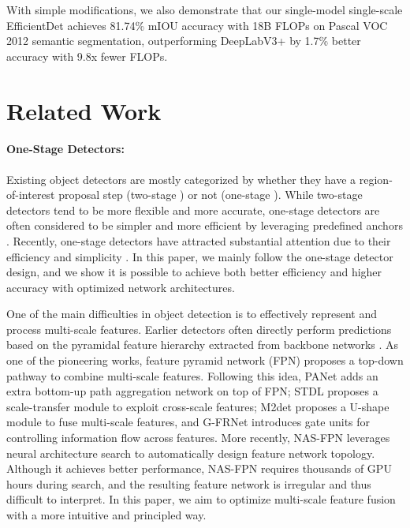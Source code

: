 \documentclass[10pt,twocolumn,letterpaper]{article}
\begin{document}
With simple modifications, we also demonstrate that our single-model single-scale EfficientDet achieves 81.74\% mIOU accuracy with 18B FLOPs on Pascal VOC 2012 semantic segmentation, outperforming DeepLabV3+ \cite{deeplabv3plus14} by 1.7\% better accuracy with 9.8x fewer FLOPs.


\section{Related Work}
\label{sec:related}

\paragraph{One-Stage Detectors: } Existing object detectors are mostly categorized by whether they have a region-of-interest proposal step (two-stage \cite{fastrcnn15,fasterrcnn15,cascade18,maskrcnn17}) or not (one-stage \cite{overfeat14,ssd16,yolo17,retinanet17}).
While two-stage detectors tend to be more flexible and more accurate, one-stage detectors are often considered to be simpler and more efficient by leveraging predefined anchors \cite{speedod17}. Recently,  one-stage detectors have attracted substantial attention  due to th\texttt{}eir efficiency and simplicity \cite{cornetnet18,m2det19,objectpoints19}. In this paper, we mainly follow the one-stage detector design, and we show it is possible to achieve both better efficiency and higher accuracy with optimized network architectures.

\medbreak \noindent {} One of the main difficulties in object detection is to effectively represent and process multi-scale features. Earlier detectors often directly perform predictions based on the pyramidal feature hierarchy extracted from backbone networks \cite{multiscaleod16,ssd16,overfeat14}. As one of the pioneering works, feature pyramid network  (FPN) \cite{fpn17} proposes a top-down pathway to combine multi-scale features. Following this idea, PANet \cite{panet18} adds an extra bottom-up path aggregation network on top of FPN; STDL \cite{stdn18} proposes a scale-transfer module to exploit cross-scale features; M2det \cite{m2det19} proposes a U-shape module to fuse multi-scale features, and G-FRNet \cite{gatelabel17} introduces gate units for controlling information flow across features. More recently, NAS-FPN \cite{nasfpn19} leverages neural architecture search to automatically design feature network topology. Although it achieves better performance, NAS-FPN requires thousands of GPU hours during search, and the resulting feature network is irregular and thus difficult to interpret. In this paper, we aim to optimize multi-scale feature fusion with a more intuitive and principled way.
\end{document}
